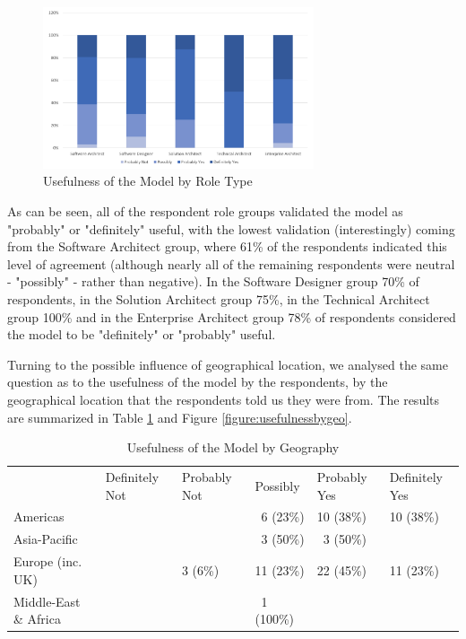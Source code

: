 \begin{figure}[h]
\centering
\includegraphics[width=8cm,trim={2 2 2 2},clip]{Figures/prioritisation-usefulness-by-role}
\caption{Usefulness of the Model by Role Type}
\label{figure:usefulnessbyrole}
\end{figure}

As can be seen, all of the respondent role groups validated the model as "probably" or "definitely" useful, with the lowest validation (interestingly) coming from the Software Architect group, where 61\% of the respondents indicated this level of agreement (although nearly all of the remaining respondents were neutral - "possibly" - rather than negative).  In the Software Designer group 70\% of respondents, in the Solution Architect group 75\%, in the Technical Architect group 100\% and in the Enterprise Architect group 78\% of respondents considered the model to be "definitely" or "probably" useful.

Turning to the possible influence of geographical location, we analysed the same question as to the usefulness of the model by the respondents, by the geographical location that the respondents told us they were from.  The results are summarized in Table \ref{table:usefulnessbygeo} and Figure \ref{figure:usefulnessbygeo}.

\begin{table}
\caption{Usefulness of the Model by Geography}
\label{table:usefulnessbygeo}
\footnotesize
\begin{tabular}{l p{1.5cm} p{1.5cm} p{1.5cm} p{1.5cm} p{1.5cm}}
 & \centering Definitely Not & 
   \centering Probably Not & 
   \centering Possibly & 
   \centering Probably Yes & 
   \centering Definitely Yes \tabularnewline
Americas              & &         & ~6 (23\%)  & 10 (38\%) & 10 (38\%) \\
Asia-Pacific          & &         & ~3 (50\%)  & ~3 (50\%) & \\
Europe (inc. UK)      & & 3 (6\%) & 11 (23\%)  & 22 (45\%) & 11 (23\%) \\
Middle-East \& Africa & &         & ~1 (100\%) &           & \\
\end{tabular}
\end{table}
 
